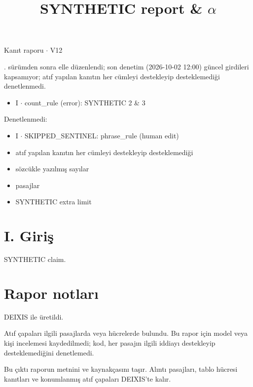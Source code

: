 \documentclass[journal]{IEEEtran}
\begin{document}
\renewcommand{\abstractname}{Özet}
\renewcommand{\IEEEkeywordsname}{Dizin Terimleri}
\renewcommand{\refname}{Kaynaklar}

\title{SYNTHETIC report \& \ensuremath{\alpha}}

\maketitle

\noindent Kanıt raporu \ensuremath{\cdot} V12

. sürümden sonra elle düzenlendi; son denetim (2026-10-02 12:00) güncel girdileri kapsamıyor; atıf yapılan kanıtın her cümleyi destekleyip desteklemediği denetlenmedi.

\begin{itemize}
\item I \ensuremath{\cdot} count\_rule (error): SYNTHETIC 2 \& 3
\end{itemize}

\noindent Denetlenmedi:

\begin{itemize}
\item I \ensuremath{\cdot} SKIPPED\_SENTINEL: phrase\_rule (human edit)
\item atıf yapılan kanıtın her cümleyi destekleyip desteklemediği
\item sözcükle yazılmış sayılar
\item pasajlar
\item SYNTHETIC extra limit
\end{itemize}

\section*{I. Giriş}

SYNTHETIC claim. \cite{Synth26}

\section*{Rapor notları}

DEIXIS ile üretildi.

Atıf çapaları ilgili pasajlarda veya hücrelerde bulundu. Bu rapor için model veya kişi incelemesi kaydedilmedi; kod, her pasajın ilgili iddiayı destekleyip desteklemediğini denetlemedi.

Bu çıktı raporun metnini ve kaynakçasını taşır. Alıntı pasajları, tablo hücresi kanıtları ve konumlanmış atıf çapaları DEIXIS'te kalır.




\end{document}
